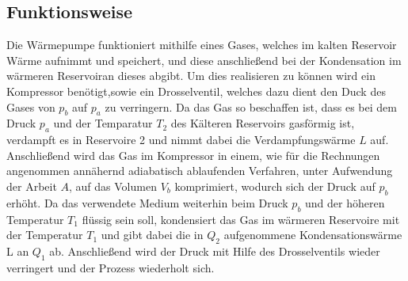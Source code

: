 \subsection{Funktionsweise}
Die Wärmepumpe funktioniert mithilfe eines Gases, welches im kalten Reservoir Wärme aufnimmt und speichert, und diese anschließend bei der Kondensation im wärmeren Reservoiran dieses abgibt. Um dies realisieren zu können wird ein Kompressor benötigt,sowie ein Drosselventil, welches dazu dient den Duck des Gases von $p_b$ auf $p_a$ zu verringern.
Da das Gas so beschaffen ist, dass es bei dem Druck $p_a$ und der Temparatur $T_2$ des Kälteren Reservoirs gasförmig ist, verdampft es in Reservoire 2 und nimmt dabei die Verdampfungswärme $L$ auf.
Anschließend wird das Gas im Kompressor in einem, wie für die Rechnungen angenommen annähernd adiabatisch ablaufenden Verfahren, unter Aufwendung der Arbeit $A$, auf das Volumen $V_b$ komprimiert, wodurch sich der Druck auf $p_b$ erhöht. 
Da das verwendete Medium weiterhin beim Druck $p_b$ und der höheren Temperatur $T_1$ flüssig sein soll, kondensiert das Gas im wärmeren Reservoire mit der Temperatur $T_1$ und gibt dabei die in $Q_2$ aufgenommene Kondensationswärme L  an $Q_1$ ab.
Anschließend wird der Druck mit Hilfe des Drosselventils wieder verringert und der Prozess wiederholt sich.
